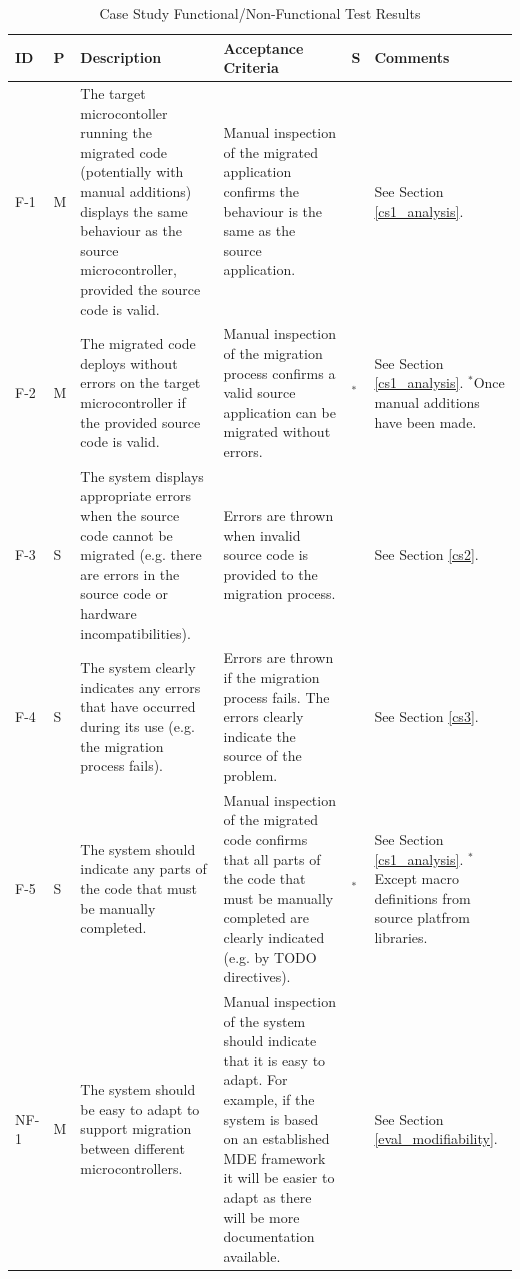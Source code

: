 \documentclass{UoYCSproject}
\newcommand{\xmark}{\ding{55}}%
\renewcommand{\checkmark}{\ding{51}}
\begin{document}
\begin{landscape}
  \begin{longtable}{@{}p{}p{}p{}p{}p{}p{}@{}} 
  \caption{Case Study Functional/Non-Functional Test Results} \\
  \toprule 
  \textbf{ID} & \textbf{P} & \textbf{Description} & \textbf{Acceptance Criteria} &\textbf{S} & \textbf{Comments} \\
  \midrule
      F-1 & M & The target microcontoller running the migrated code (potentially with manual additions) displays the same behaviour as the source microcontroller, provided the source code is valid. & Manual inspection of the migrated application confirms the behaviour is the same as the source application. & \checkmark & See Section \ref{cs1_analysis}. \\
  F-2 & M & The migrated code deploys without errors on the target microcontroller if the provided source code is valid. & Manual inspection of the migration process confirms a valid source application can be migrated without errors. & \checkmark$^*$ & See Section \ref{cs1_analysis}. $^*$Once manual additions have been made. \\
  F-3 & S & The system displays appropriate errors when the source code cannot be migrated (e.g. there are errors in the source code or hardware incompatibilities). & Errors are thrown when invalid source code is provided to the migration process. & \xmark & See Section \ref{cs2}. \\  
  F-4 & S & The system clearly indicates any errors that have occurred during its use (e.g. the migration process fails). & Errors are thrown if the migration process fails. The errors clearly indicate the source of the problem. & \xmark & See Section \ref{cs3}. \\
  F-5 & S & The system should indicate any parts of the code that must be manually completed. & Manual inspection of the migrated code confirms that all parts of the code that must be manually completed are clearly indicated (e.g. by TODO directives). & \checkmark$^*$ & See Section \ref{cs1_analysis}. $^*$Except macro definitions from source platfrom libraries. \\
    NF-1 & M & The system should be easy to adapt to support migration between different microcontrollers. & Manual inspection of the system should indicate that it is easy to adapt. For example, if the system is based on an established MDE framework it will be easier to adapt as there will be more documentation available. & \checkmark & See Section \ref{eval_modifiability}. \\

\end{longtable}
\end{landscape}
\end{document}
